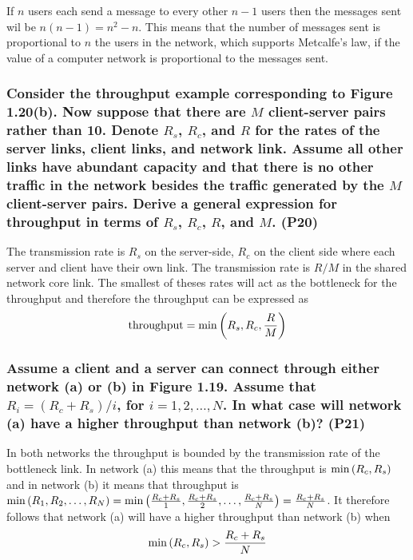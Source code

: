 If $n$ users each send a message to every other $n - 1$ users then the messages sent wil be $n(n- 1) = n^2 - n$. This means that the number of messages sent is proportional to $n$ the users in the network, which supports Metcalfe's law, if the value of a computer network is proportional to the messages sent.


\subsubsection{Consider the throughput example corresponding to Figure 1.20(b). Now suppose that there are $M$ client-server pairs rather than 10. Denote $R_s$, $R_c$, and $R$ for the rates of the server links, client links, and network link. Assume all other links have abundant capacity and that there is no other traffic in the network besides the traffic generated by the $M$ client-server pairs. Derive a general expression for throughput in terms of $R_s$, $R_c$, $R$, and $M$. (P20)}

The transmission rate is $R_s$ on the server-side, $R_c$ on the client side where each server and client have their own link. The transmission rate is $R/M$ in the shared network core link. The smallest of theses rates will act as the bottleneck for the throughput and therefore the throughput can be expressed as
\begin{equation*}
    \text{throughput} = \min \left (R_s, R_c, \frac{R}{M}\right)
\end{equation*}



\subsubsection{Assume a client and a server can connect through either network (a) or (b) in Figure 1.19. Assume that $R_i=(R_c + R_s)/i$, for $i=1, 2, \dots, N$. In what case will network (a) have a higher throughput than network (b)? (P21)}

In both networks the throughput is bounded by the transmission rate of the bottleneck link. In network (a) this means that the throughput is $\min \left (R_c, R_s\right)$ and in network (b) it means that throughput is $\min \left (R_1, R_2, \dots, R_N\right) = \min \left (\frac{R_c + R_s}{1}, \frac{R_c + R_s}{2}, \dots, \frac{R_c + R_s}{N}\right) = \frac{R_c + R_s}{N}$. It therefore follows that network (a) will have a higher throughput than network (b) when
\begin{equation*}
    \min \left (R_c, R_s\right) > \frac{R_c + R_s}{N}
\end{equation*}




